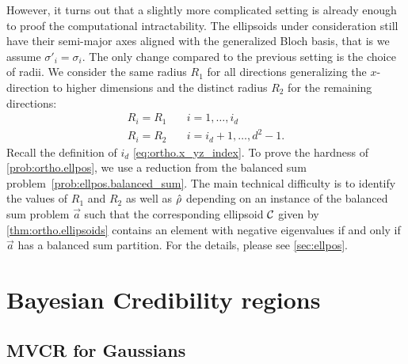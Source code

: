 However, it turns out that a slightly more complicated setting is already enough to proof the computational intractability.
The ellipsoids under consideration still have their semi-major axes aligned with the generalized Bloch basis, that is we assume $\sigma'_i = \sigma_i$.
The only change compared to the previous setting is the choice of radii.
We consider the same radius $R_{1}$ for all directions generalizing the $x$-direction to higher dimensions and the distinct radius $R_{2}$ for the remaining directions:
\[
  \label{eq:ortho.subclass}
  \begin{split}
    R_{i}=R_{1} &\quad i=1,\ldots,i_{d}\\
    R_{i}=R_{2} &\quad i=i_{d}+1,\ldots,d^{2}-1.
  \end{split}
\]
Recall the definition of $i_d$ \cref{eq:ortho.x_yz_index}.
To prove the hardness of \cref{prob:ortho.ellpos}, we use a reduction from the balanced sum problem~\ref{prob:ellpos.balanced_sum}.
The main technical difficulty is to identify the values of $R_1$ and $R_2$ as well as $\hat{\rho}$ depending on an instance of the balanced sum problem $\vec a$ such that the corresponding ellipsoid $\mathcal{C}$ given by \cref{thm:ortho.ellipsoids} contains an element with negative eigenvalues if and only if $\vec a$ has a balanced sum partition.
For the details, please see \cref{sec:ellpos}.















\section{Bayesian Credibility regions}
\label{sec:bayesian}


\subsection{MVCR for Gaussians}
\label{sub:bayesian.gaussian}

